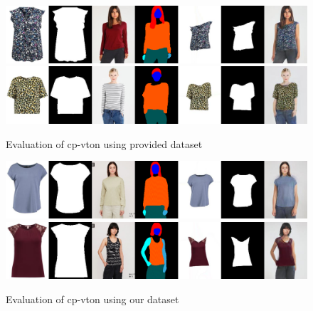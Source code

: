 \documentclass{article}
\begin{document}
\begin{figure}[H]
    \centering
    \includegraphics[width=1\textwidth]{cp-vton-imgs/visual1.png}
    \includegraphics[width=1\textwidth]{cp-vton-imgs/visual2.png}
    \caption{Evaluation of cp-vton using provided dataset}
    \label{fig:provided}
\end{figure}

\begin{figure}[H]
    \centering
    \includegraphics[width=1\textwidth]{cp-vton-imgs/src_a_dst_018746.png}
    \includegraphics[width=1\textwidth]{cp-vton-imgs/src_b_dst_005053.png}
    \caption{Evaluation of cp-vton using our dataset}
    \label{fig:our}
\end{figure}



\printbibliography
\end{document}
